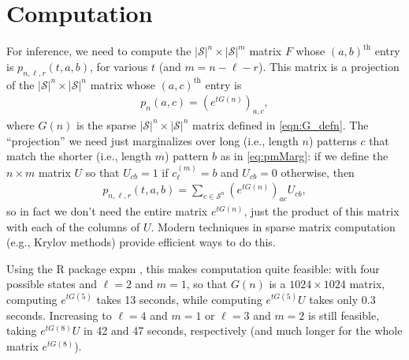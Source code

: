 \documentclass{article}
\newcommand{\calS}{\mathcal{S}}  %
\theoremstyle{plain}
\theoremstyle{definition}
\begin{document}
\section{Computation}

For inference, we need to compute the $|\calS|^{n} \times |\calS|^m$ matrix $F$ whose $(a,b)^\text{th}$ entry is $p_{n,\ell,r}(t,a,b)$,
for various $t$ (and $m = n - \ell - r$).
This matrix is a projection of the $|\calS|^{n} \times |\calS|^{n}$ matrix whose $(a,c)^\text{th}$ entry is
\begin{align}
    p_{n}(a,c) = \left( e^{t G(n)} \right)_{a,c} ,
\end{align}
where $G(n)$ is the sparse $|\calS|^{n} \times |\calS|^{n}$ matrix defined in \eqref{eqn:G_defn}.
The ``projection'' we need just marginalizes over long (i.e., length $n$) patterns $c$ that match the shorter (i.e., length $m$) pattern $b$
as in \eqref{eq:pmMarg}:
if we define the $n \times m$ matrix $U$ so that $U_{cb}=1$ if $c_\ell^{(m)}=b$ and $U_{cb}=0$ otherwise,
then
\begin{align} \label{eqn:Tmer_trans}
    p_{n,\ell,r}(t,a,b) = \sum_{c \in \calS^{n}} \left( e^{t G(n)} \right)_{ac} U_{cb} ,
\end{align}
so in fact we don't need the entire matrix $e^{t G(n)}$,
just the product of this matrix with each of the columns of $U$.
Modern techniques in sparse matrix computation (e.g., Krylov methods) provide efficient ways to do this.

Using the R package expm \citep{R_expm}, this makes computation quite feasible:
with four possible states and $\ell=2$ and $m=1$, so that $G(n)$ is a $1024 \times 1024$ matrix,
computing $e^{t G(5) }$ takes 13 seconds, while computing $e^{t G(5)} U$ takes only 0.3 seconds.
Increasing to $\ell=4$ and $m=1$ or $\ell=3$ and $m=2$ is still feasible, taking $e^{t G(8)} U$ in 42 and 47 seconds, respectively
(and much longer for the whole matrix $e^{t G(8)}$).

\end{document}
